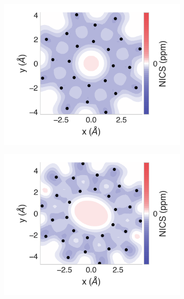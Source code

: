 \documentclass[
	fontsize=10pt, %
	twoside=true, %
	numbers=noenddot, %
]{kaobook}
\begin{document}
\begin{figure}[h]
\begin{subfigure}{5.5cm}\centering\includegraphics{pn08-2d}\end{subfigure}%
\begin{subfigure}{5.5cm}\centering\includegraphics{pn10-2d}\end{subfigure}%

\end{figure}
\end{document}
